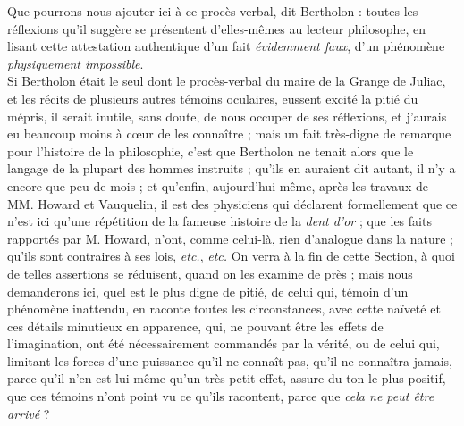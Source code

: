 \documentclass[a4paper, 11pt, oneside, polutonikogreek, french]{article}
\begin{document}
{{\hspace*{5mm}\og Que pourrons-nous ajouter ici à ce procès-verbal, dit Bertholon : toutes les réflexions qu'il suggère se présentent d'elles-mêmes au lecteur philosophe, en lisant cette attestation authentique d'un fait \emph{évidemment faux}, d'un phénomène \emph{physiquement impossible}. \fg \\
\hspace*{5mm}Si Bertholon était le seul dont le procès-verbal du maire de la Grange de Juliac, et les récits de plusieurs autres témoins oculaires, eussent excité la pitié du mépris, il serait inutile, sans doute, de nous occuper de ses réflexions, et j'aurais eu beaucoup moins à cœur de les connaître ; mais un fait très-digne de remarque pour l'histoire de la philosophie, c'est que Bertholon ne tenait alors que le langage de la plupart des hommes instruits ; qu'ils en auraient dit autant, il n'y a encore que peu de mois ; et qu'enfin, aujourd'hui même, après les travaux de MM. Howard et Vauquelin, il est des physiciens qui déclarent formellement que ce n'est ici qu'une répétition de la fameuse histoire de la \emph{dent d'or} ; que les faits rapportés par M. Howard, n'ont, comme celui-là, rien d'analogue dans la nature ; qu'ils sont contraires à ses lois, \emph{etc.}, \emph{etc.} On verra à la fin de cette Section, à quoi de telles assertions se réduisent, quand on les examine de près ; mais nous demanderons ici, quel est le plus digne de pitié, de celui qui, témoin d'un phénomène inattendu, en raconte toutes les circonstances, avec cette naïveté et ces détails minutieux en apparence, qui, ne pouvant être les effets de l'imagination, ont été nécessairement commandés par la vérité, ou de celui qui, limitant les forces d'une puissance qu'il ne connaît pas, qu'il ne connaîtra jamais, parce qu'il n'en est lui-même qu'un très-petit effet, assure du ton le plus positif, que ces témoins n'ont point vu ce qu'ils racontent, parce que \emph{cela ne peut être arrivé} ?\\
}}
\end{document}
